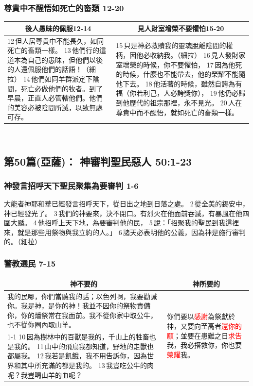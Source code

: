 \subsubsection{尊貴中不醒悟如死亡的畜類 12-20}
\begin{table}[H]
\centering
\begin{tabular}{p{}|p{10.5cm}}\hline\hline
\multicolumn{1}{c|}{後人愚昧的佩服12-14}&\multicolumn{1}{c}{見人財室增榮不要懼怕15-20}\\\hline
12 但人居尊貴中不能長久，如同死亡的畜類一樣。
13 他們行的這道本為自己的愚昧，但他們以後的人還佩服他們的話語！（細拉）
14 他們如同羊群派定下陰間，死亡必做他們的牧者。到了早晨，正直人必管轄他們。他們的美容必被陰間所滅，以致無處可存。
&15 只是神必救贖我的靈魂脫離陰間的權柄，因他必收納我。（細拉）
16 見人發財家室增榮的時候，你不要懼怕，
17 因為他死的時候，什麼也不能帶去，他的榮耀不能隨他下去。
18 他活著的時候，雖然自誇為有福（你若利己，人必誇獎你），
19 他仍必歸到他歷代的祖宗那裡，永不見光。
20 人在尊貴中而不醒悟，就如死亡的畜類一樣。\\\hline
\end{tabular}
\end{table} 



\subsection{第50篇(亞薩)： 神審判聖民惡人 50:1-23}
\subsubsection{神發言招呼天下聖民聚集為要審判 1-6}
大能者神耶和華已經發言招呼天下，從日出之地到日落之處。
2 從全美的錫安中，神已經發光了。
3 我們的神要來，決不閉口。有烈火在他面前吞滅，有暴風在他四圍大颳。
4 他招呼上天下地，為要審判他的民，
5 說：「招聚我的聖民到我這裡來，就是那些用祭物與我立約的人。」
6 諸天必表明他的公義，因為神是施行審判的。（細拉）
\subsubsection{警教選民 7-15}
\begin{table}[H]
\centering
\begin{tabular}{p{}|p{3.4cm}}\hline\hline
\multicolumn{1}{c|}{神不要的}&\multicolumn{1}{c}{神所要的}\\\hline
我的民哪，你們當聽我的話；以色列啊，我要勸誡你。我是神，是你的神！我並不因你的祭物責備你，你的燔祭常在我面前。我不從你家中取公牛，也不從你圈內取山羊。
&\multirow{2}{3.5cm}{你們要以\textcolor{red}{感謝}為祭獻於神，又要向至高者\textcolor{red}{還你的願}；並要在患難之日\textcolor{red}{求告}我，我必搭救你，你也要\textcolor{red}{榮耀}我。}\\\cline{1-1}
10 因為樹林中的百獸是我的，千山上的牲畜也是我的。
11 山中的飛鳥我都知道，野地的走獸也都屬我。
12 我若是飢餓，我不用告訴你，因為世界和其中所充滿的都是我的。
13 我豈吃公牛的肉呢？我豈喝山羊的血呢？&\\\hline
\end{tabular}
\end{table} 

